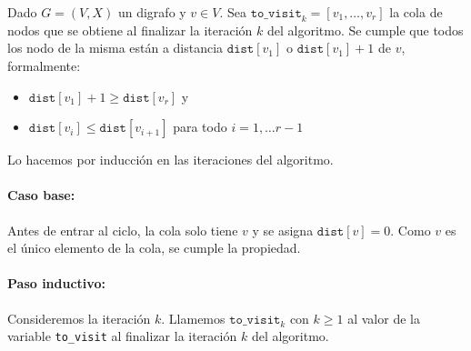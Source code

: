 \begin{lema}
  Dado \(G=(V,X)\) un digrafo y \(v\in V\). Sea \(\texttt{to\_visit}_k=[v_1,\dots,v_r]\) la cola de nodos que se obtiene al finalizar la iteración \(k\) del algoritmo. Se cumple que todos los nodo de la misma están a distancia \(\texttt{dist}[v_1]\) o \( \texttt{dist}[v_1]+ 1\) de \(v\), formalmente:
  \begin{itemize}
    \item \(\texttt{dist}[v_1] + 1 \geq \texttt{dist}[v_r]\) y
    \item \(\texttt{dist}[v_i] \leq \texttt{dist}[v_{i+1}]\) para todo \(i = 1,\dots r-1\)
  \end{itemize}
\end{lema}
\begin{demo}
  Lo hacemos por inducción en las iteraciones del algoritmo.
  \paragraph{Caso base:} Antes de entrar al ciclo, la cola solo tiene \(v\) y se asigna \(\texttt{dist}[v] = 0 \). Como \(v\) es el único elemento de la cola, se cumple la propiedad.


  \paragraph{Paso inductivo:} Consideremos la iteración \(k\). Llamemos \(\texttt{to\_visit}_k\) con \(k \geq 1\) al valor de la variable \texttt{to\_visit} al finalizar la iteración \(k\) del algoritmo.


\end{demo}
